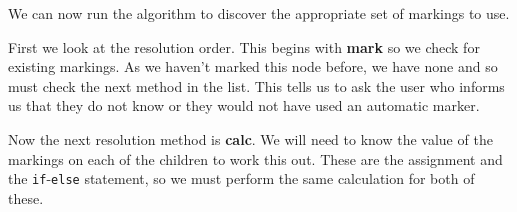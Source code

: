 \documentclass{report}
\begin{document}


We can now run the algorithm to discover the appropriate set of markings to use.

First we look at the resolution order. This begins with \textbf{mark} so we check for existing markings. As we haven't marked this node before,
we have none and so must check the next method in the list. This tells us to ask the user who informs us that they do not know or they would not
have used an automatic marker.

Now the next resolution method is \textbf{calc}. We will need to know the value of the markings on each of the children to work this out. These
are the assignment and the \texttt{if}-\texttt{else} statement, so we must perform the same calculation for both of these.
\end{document}
